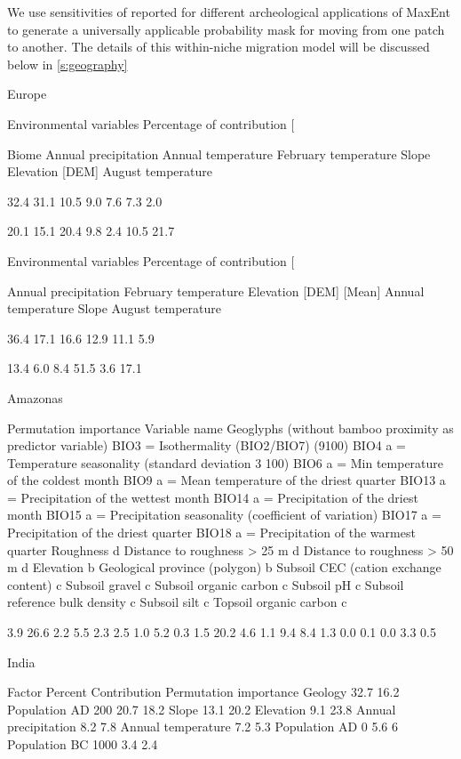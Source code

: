 We use
sensitivities of reported for different archeological applications of MaxEnt
\cite{burke2017risky,gillespie2016predictive,jones2019mapping,kondo2012developing,kondo2018ecological,mcmichael2014bamboodominated,muttaqin2019maxent,oyarzun2016predicting,souza2020archaeological,walker2019persistence}
to generate a universally applicable probability mask for moving from one patch
to another. The details of this within-niche migration model will be discussed
below in \cref{s:geography}


\cite{kondo2012developing}
Europe

Environmental variables Percentage of contribution [%

Biome
Annual precipitation
Annual temperature
February temperature
Slope
Elevation [DEM]
August temperature

32.4
31.1
10.5
9.0
7.6
7.3
2.0

20.1
15.1
20.4
9.8
2.4
10.5
21.7

Environmental variables Percentage of contribution [%

Annual precipitation
February temperature
Elevation [DEM]
[Mean] Annual temperature
Slope
August temperature

36.4
17.1
16.6
12.9
11.1
5.9

13.4
6.0
8.4
51.5
3.6
17.1

\cite{mcmichael2014bamboodominated}
Amazonas

Permutation importance
Variable name Geoglyphs (without bamboo proximity as predictor variable)
BIO3 = Isothermality (BIO2/BIO7) (9100)
BIO4 a = Temperature seasonality (standard deviation 3 100)
BIO6 a = Min temperature of the coldest month
BIO9 a = Mean temperature of the driest quarter
BIO13 a = Precipitation of the wettest month
BIO14 a = Precipitation of the driest month
BIO15 a = Precipitation seasonality (coefficient of variation)
BIO17 a = Precipitation of the driest quarter
BIO18 a = Precipitation of the warmest quarter
Roughness d
Distance to roughness > 25 m d
Distance to roughness > 50 m d
Elevation b
Geological province (polygon) b
Subsoil CEC (cation exchange content) c
Subsoil gravel c
Subsoil organic carbon c
Subsoil pH c
Subsoil reference bulk density c
Subsoil silt c
Topsoil organic carbon c

3.9
26.6
2.2
5.5
2.3
2.5
1.0
5.2
0.3
1.5
20.2
4.6
1.1
9.4
8.4
1.3
0.0
0.1
0.0
3.3
0.5

\parencite{gillespie2016predictive}
India

Factor Percent Contribution Permutation importance
Geology 32.7 16.2
Population AD 200 20.7 18.2
Slope 13.1 20.2
Elevation 9.1 23.8
Annual precipitation 8.2 7.8
Annual temperature 7.2 5.3
Population AD 0 5.6 6
Population BC 1000 3.4 2.4

